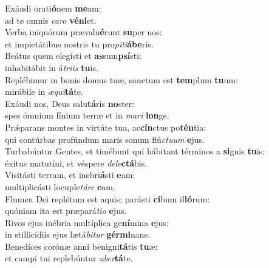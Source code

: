 \evenverse Exáudi orati\textbf{ó}nem \textbf{me}am:~\*\\
\evenverse ad te omnis \textit{ca}\textit{ro} \textbf{vé}\textbf{ni}et.\\
\oddverse Verba iniquórum prævalu\textbf{é}runt \textbf{su}per nos:~\*\\
\oddverse et impietátibus nostris tu pro\textit{pi}\textit{ti}\textbf{á}\textbf{be}ris.\\
\evenverse Beátus quem elegísti et \textbf{as}sum\textbf{psí}sti:~\*\\
\evenverse inhabitábit in á\textit{tri}\textit{is} \textbf{tu}is.\\
\oddverse Replébimur in bonis domus tuæ, sanctum est \textbf{tem}plum \textbf{tu}um:~\*\\
\oddverse mirábile in \textit{æ}\textit{qui}\textbf{tá}te.\\
\evenverse Exáudi nos, Deus salu\textbf{tá}ris \textbf{no}ster:~\*\\
\evenverse spes ómnium fínium terræ et in \textit{ma}\textit{ri} \textbf{lon}ge.\\
\oddverse Prǽparans montes in virtúte tua, ac\textbf{cín}ctus po\textbf{tén}tia:~\*\\
\oddverse qui contúrbas profúndum maris sonum flú\textit{ctu}\textit{um} \textbf{e}jus.\\
\evenverse Turbabúntur Gentes, et timébunt qui hábitant términos a \textbf{si}gnis \textbf{tu}is:~\*\\
\evenverse éxitus matutíni, et véspere \textit{de}\textit{le}\textbf{ctá}bis.\\
\oddverse Visitásti terram, et inebri\textbf{á}sti \textbf{e}am:~\*\\
\oddverse multiplicásti locuple\textit{tá}\textit{re} \textbf{e}am.\\
\evenverse Flumen Dei replétum est aquis; parásti \textbf{ci}bum il\textbf{ló}rum:~\*\\
\evenverse quóniam ita est præpará\textit{ti}\textit{o} \textbf{e}jus.\\
\oddverse Rivos ejus inébria multíplica ge\textbf{ní}mina \textbf{e}jus:~\*\\
\oddverse in stillicídiis ejus lætá\textit{bi}\textit{tur} \textbf{gér}\textbf{mi}nans.\\
\evenverse Benedíces corónæ anni benigni\textbf{tá}tis \textbf{tu}æ:~\*\\
\evenverse et campi tui replebúntur \textit{u}\textit{ber}\textbf{tá}te.\\
